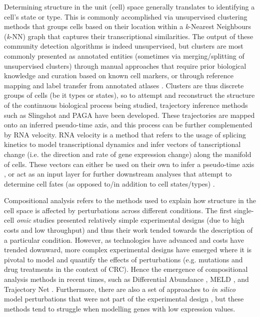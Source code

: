 Determining structure in the unit (cell) space generally translates to identifying a cell's state or type. This is commonly accomplished via unsupervised clustering methods that groups cells based on their location within a \emph{k}-Nearest Neighbours (\emph{k}-NN) graph that captures their transcriptional similarities. The output of these community detection algorithms \cite{blondel_fast_2008,traag_louvain_2019} is indeed unsupervised, but clusters are most commonly presented as annotated entities (sometimes via merging/splitting of unsupervised clusters) through manual approaches that require prior biological knowledge and curation based on known cell markers, or through reference mapping and label transfer from annotated atlases \cite{lotfollahi_mapping_2022}. Clusters are thus discrete groups of cells (be it types or states), so to attempt and reconstruct the structure of the continuous biological process being studied, trajectory inference methods such as Slingshot \cite{street_slingshot_2018} and PAGA \cite{wolf_paga_2019} have been developed. These trajectories are mapped onto an inferred pseudo-time axis, and this process can be further complemented by RNA velocity. RNA velocity \cite{la_manno_rna_2018} is a method that refers to the usage of splicing kinetics to model transcriptional dynamics and infer vectors of tanscriptional change (i.e. the direction and rate of gene expression change) along the manifold of cells. These vectors can either be used on their own to infer a pseudo-time axis \cite{bergen_generalizing_2020}, or act as an input layer for further downstream analyses that attempt to determine cell fates (as opposed to/in addition to cell states/types) \cite{lange_cellrank_2022}.

Compositional analysis refers to the methods used to explain how structure in the cell space is affected by perturbations across different conditions. The first single-cell \emph{omic} studies presented relatively simple experimental designs (due to high costs and low throughput) and thus their work tended towards the description of a particular condition. However, as technologies have advanced and costs have trended downward, more complex experimental designs have emerged where it is pivotal to model and quantify the effects of perturbations (e.g. mutations and drug treatments in the context of CRC). Hence the emergence of compositional analysis methods in recent times, such as Differential Abundance \cite{lun_testing_2017,dann_differential_2022}, MELD \cite{burkhardt_quantifying_2021}, and Trajectory Net \cite{tong_trajectorynet_2020}. Furthermore, there are also a set of approaches to \emph{in silico} model perturbations that were not part of the experimental design \cite{lotfollahi_scgen_2019,yuan_cellbox_2021,lotfollahi_learning_2021}, but these methods tend to struggle when modelling genes with low expression values.

